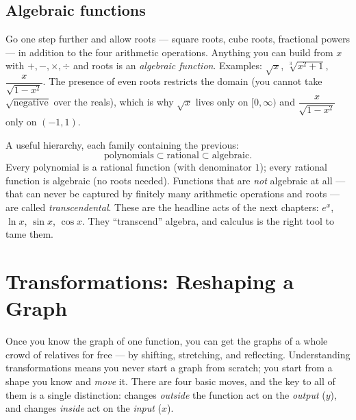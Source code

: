 \subsection{Algebraic functions}

Go one step further and allow roots --- square roots, cube roots, fractional
powers --- in addition to the four arithmetic operations. Anything you can build
from $x$ with $+,-,\times,\div$ and roots is an \emph{algebraic function}. Examples:
$\sqrt{x}$, $\sqrt[3]{x^2+1}$, $\dfrac{x}{\sqrt{1-x^2}}$. The presence of even
roots restricts the domain (you cannot take $\sqrt{\text{negative}}$ over the
reals), which is why $\sqrt{x}$ lives only on $[0,\infty)$ and
$\dfrac{x}{\sqrt{1-x^2}}$ only on $(-1,1)$.

\begin{focusbox}
A useful hierarchy, each family containing the previous:
\[
  \text{polynomials} \subset \text{rational} \subset \text{algebraic}.
\]
Every polynomial is a rational function (with denominator $1$); every rational
function is algebraic (no roots needed). Functions that are \emph{not} algebraic at
all --- that can never be captured by finitely many arithmetic operations and
roots --- are called \emph{transcendental}. These are the headline acts of the next
chapters: $e^x$, $\ln x$, $\sin x$, $\cos x$. They ``transcend'' algebra, and
calculus is the right tool to tame them.
\end{focusbox}

\section{Transformations: Reshaping a Graph}
\label{ch02:transformations}

Once you know the graph of one function, you can get the graphs of a whole crowd
of relatives for free --- by shifting, stretching, and reflecting. Understanding
transformations means you never start a graph from scratch; you start from a shape
you know and \emph{move} it. There are four basic moves, and the key to all of them
is a single distinction: changes \emph{outside} the function act on the
\emph{output} ($y$), and changes \emph{inside} act on the \emph{input} ($x$).

